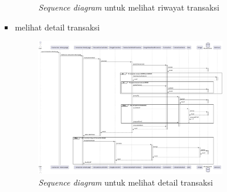 \documentclass[a4paper]{article}
\begin{document}
\begin{enumerate}
\begin{enumerate}
\begin{itemize}
\begin{figure}[h]
                \caption{\textit{Sequence diagram} untuk melihat riwayat transaksi}
            \end{figure}
            \item melihat detail transaksi
            \begin{figure}[h]
                \centering
                \includegraphics*[height=6cm]{./diagram/sequence diagram/15. transaction/view transaction detail/view transaction detail.png}
                \caption{\textit{Sequence diagram} untuk melihat detail transaksi}
            \end{figure}
        \end{itemize}
        \newpage


\end{enumerate}
\end{enumerate}
\end{document}
